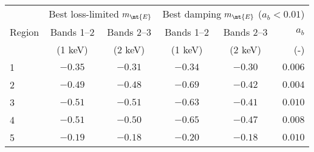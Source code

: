 \begin{tabular}{@{}l cc cc r@{}}
\toprule
{} & \multicolumn{2}{c}{Best loss-limited $m_\mt{E}$}
   & \multicolumn{3}{c}{Best damping $m_\mt{E}$ ($a_b < 0.01$)} \\
\cmidrule(lr){2-3} \cmidrule(l){4-6}

Region & Bands 1--2 & Bands 2--3
       & Bands 1--2 & Bands 2--3 & $a_b$ \\ [0.2em]
{} & (1 keV) & (2 keV)
   & (1 keV) & (2 keV) & (-) \\

\midrule
1 & $-0.35$ & $-0.31$ & $-0.34$ & $-0.30$ & $0.006$ \\
2 & $-0.49$ & $-0.48$ & $-0.69$ & $-0.42$ & $0.004$ \\
3 & $-0.51$ & $-0.51$ & $-0.63$ & $-0.41$ & $0.010$ \\
4 & $-0.51$ & $-0.50$ & $-0.65$ & $-0.47$ & $0.008$ \\
5 & $-0.19$ & $-0.18$ & $-0.20$ & $-0.18$ & $0.010$ \\
\bottomrule
\end{tabular}

